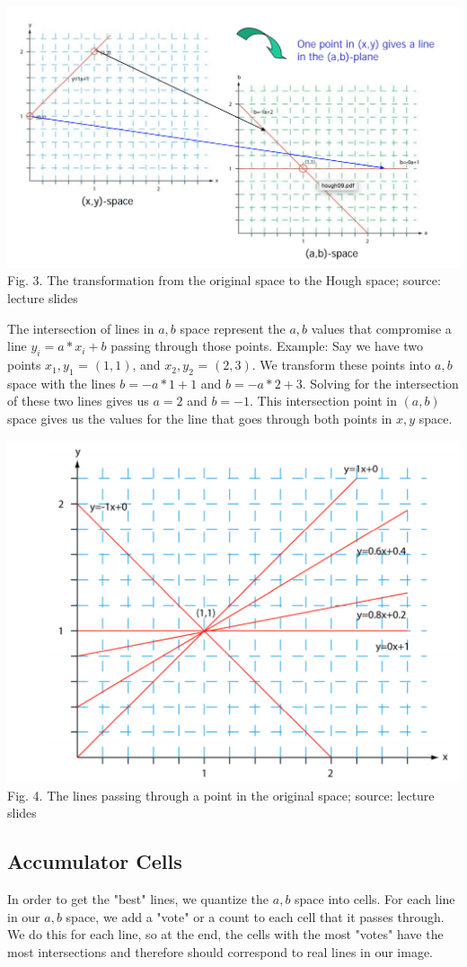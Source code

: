 \documentclass{article}
\begin{document}
\includegraphics[width=\textwidth]{hough_transform.png}
Fig. 3. The transformation from the original space to the Hough space; source: lecture slides

The intersection of lines in $a,b$ space represent the $a,b$ values that compromise a line $y_i = a*x_i + b$ passing through those points. Example:
Say we have two points $x_1,y_1$ = $(1,1)$, and $x_2,y_2$ = $(2,3)$.
We transform these points into $a,b$ space with the lines $b = -a*1 + 1$ and $b = -a*2 + 3$.
Solving for the intersection of these two lines gives us $a=2$ and $b=-1$. This intersection point in $(a,b)$ space gives us the values for the line that goes through both points in $x,y$ space.

\includegraphics[width=\textwidth]{hough_transform2.png}
Fig. 4. The lines passing through a point in the original space; source: lecture slides

\subsection{Accumulator Cells}
In order to get the "best" lines, we quantize the $a,b$ space into cells. For each line in our $a,b$ space, we add a "vote" or a count to each cell that it passes through. We do this for each line, so at the end, the cells with the most "votes" have the most intersections and therefore should correspond to real lines in our image.
\end{document}
